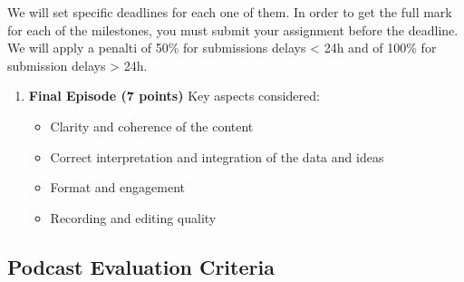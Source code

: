 \documentclass[
  letterpaper,
  DIV=11,
  numbers=noendperiod]{scrreprt}
\providecommand{\tightlist}{%
  \setlength{\itemsep}{0pt}\setlength{\parskip}{0pt}}\usepackage{longtable,booktabs,array}
\begin{document}
We will set specific deadlines for each one of them. In order to get the
full mark for each of the milestones, you must submit your assignment
before the deadline. We will apply a penalti of 50\% for submissions
delays \textless{} 24h and of 100\% for submission delays \textgreater{}
24h.

\begin{enumerate}
\def\labelenumi{\arabic{enumi}.}
\setcounter{enumi}{1}
\tightlist
\item
  \textbf{Final Episode (7 points)} Key aspects considered:

  \begin{itemize}
  \tightlist
  \item
    Clarity and coherence of the content
  \item
    Correct interpretation and integration of the data and ideas
  \item
    Format and engagement
  \item
    Recording and editing quality
  \end{itemize}
\end{enumerate}

\subsection{Podcast Evaluation
Criteria}\label{podcast-evaluation-criteria}
\end{document}
